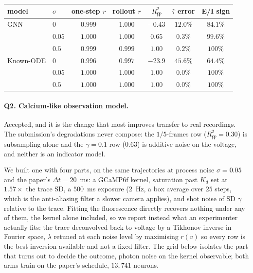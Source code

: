 \documentclass[11pt]{article}
\newcommand{\Rw}{R^2_{\widehat W}}
\begin{document}
\begin{center}
{\scriptsize
\setlength{\tabcolsep}{5pt}
\begin{tabular}{ll cc ccc}
\toprule
model & $\sigma$ & one-step $r$ & rollout $r$ & $\Rw$ & $\hat\tau$ error & E/I sign \\
\midrule
GNN       & $0$    & $0.999$ & $1.000$ & $-0.43$ & $12.0\%$ & $84.1\%$ \\
          & $0.05$ & $1.000$ & $1.000$ & $0.65$  & $0.3\%$  & $99.6\%$ \\
          & $0.5$  & $0.999$ & $0.999$ & $1.00$  & $0.2\%$  & $100\%$ \\
\midrule
Known-ODE & $0$    & $0.996$ & $0.997$ & $-23.9$ & $45.6\%$ & $64.4\%$ \\
          & $0.05$ & $1.000$ & $1.000$ & $1.00$  & $0.0\%$  & $100\%$ \\
          & $0.5$  & $1.000$ & $1.000$ & $1.00$  & $0.0\%$  & $100\%$ \\
\bottomrule
\end{tabular}}

\end{center}


\paragraph{Q2. Calcium-like observation model.}
Accepted, and it is the change that most improves transfer to real recordings.
The submission's degradations never compose: the $1/5$-frames row
($\Rw = 0.30$) is subsampling alone and the $\gamma = 0.1$ row ($0.63$) is
additive noise on the voltage, and neither is an indicator model.

We built one with four parts, on the same trajectories at process noise
$\sigma = 0.05$ and the paper's $\Delta t = 20$~ms: a GCaMP6f kernel, saturation
past $K_d$ set at $1.57\times$ the trace SD, a $500$~ms exposure ($2$~Hz, a box
average over $25$ steps, which is the anti-aliasing filter a slower camera
applies), and shot noise of SD $\gamma$ relative to the trace. Fitting the
fluorescence directly recovers nothing under any of them, the kernel alone
included, so we report instead what an experimenter actually fits: the trace
deconvolved back to voltage by a Tikhonov inverse in Fourier space, $\lambda$
retuned at each noise level by maximising $r(\dot v)$ so every row is the best
inversion available and not a fixed filter. The grid below isolates the part that
turns out to decide the outcome, photon noise on the kernel observable; both arms
train on the paper's schedule, $13{,}741$ neurons.
\end{document}
